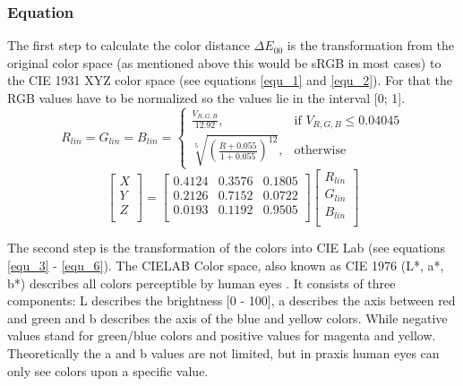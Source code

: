 \subsubsection{Equation}\label{subsec:equation}
The first step to calculate the color distance $\Delta E_{00}$ is the transformation from the original color space (as mentioned above this would be sRGB in most cases) to the CIE 1931 XYZ color space (see equations \ref{equ_1} and \ref{equ_2}). For that the RGB values have to be normalized so the values lie in the interval [0; 1]. 
\begin{equation}\label{equ_1}
R_{lin} = G_{lin} = B_{lin} =
	\begin{cases}
		\frac{V_{R,G,B}}{12.92}, & \text{if $V_{R,G,B} \leq 0.04045$}\\
		\sqrt[5]{(\frac{R + 0.055}{1 + 0.055})^{12}}, & \text{otherwise}
	\end{cases}
\end{equation}
\begin{equation}\label{equ_2}
\left[ \begin{array}{r}
X \\ 
Y \\
Z \\ 
\end{array}\right] = \left[ \begin{array}{rrr}
0.4124 & 0.3576 & 0.1805 \\ 
0.2126 & 0.7152 & 0.0722 \\
0.0193 & 0.1192 & 0.9505 \\ 
\end{array}\right] \left[ \begin{array}{r}
R_{lin} \\ 
G_{lin} \\
B_{lin} \\ 
\end{array}\right]
\end{equation}

The second step is the transformation of the colors into CIE Lab (see  equations \ref{equ_3} - \ref{equ_6}). The CIELAB Color space, also known as CIE 1976 (L*, a*, b*) describes all colors perceptible by human eyes \parencite{levkowitz1997}. It consists of three components: L describes the brightness [0 - 100], a describes the axis between red and green and b describes the axis of the blue and yellow colors. While negative values stand for green/blue colors and positive values for magenta and yellow. Theoretically the a and b values are not limited, but in praxis human eyes can only see colors upon a specific value. 

